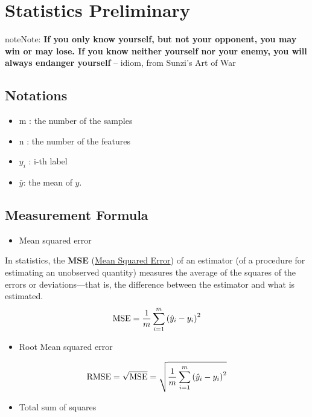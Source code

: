 \documentclass[letterpaper,11pt,english]{sphinxmanual}
\begin{document}
\chapter{Statistics Preliminary}
\label{stats:statistics-preliminary}\label{stats:yassine-alouini}\label{stats:stats}\label{stats::doc}
\begin{notice}{note}{Note:}
\textbf{If you only know yourself, but not your opponent, you may win or may lose.
If you know neither yourself nor your enemy, you will always endanger yourself}
– idiom, from Sunzi’s Art of War
\end{notice}


\section{Notations}
\label{stats:notations}\begin{itemize}
\item {} 
m : the number of the samples

\item {} 
n : the number of the features

\item {} 
\(y_i\) : i-th label

\item {} 
\({\displaystyle {\bar {y}}}\):  the mean of \(y\).

\end{itemize}


\section{Measurement Formula}
\label{stats:measurement-formula}\begin{itemize}
\item {} 
Mean squared error

\end{itemize}

In statistics, the \textbf{MSE} (\href{https://en.wikipedia.org/wiki/Mean\_squared\_error}{Mean Squared Error}) of an estimator (of a procedure for estimating an unobserved quantity) measures the average of the squares of the errors or deviations—that is, the difference between the estimator and what is estimated.
\begin{gather}
\begin{split}\text{MSE}=\frac{1}{m}\sum_{i=1}^m\left( \hat{y}_i-y_i\right)^2\end{split}\notag
\end{gather}\begin{itemize}
\item {} 
Root Mean squared error

\end{itemize}
\begin{gather}
\begin{split}\text{RMSE} = \sqrt{\text{MSE}}=\sqrt{\frac{1}{m}\sum_{i=1}^m\left( \hat{y}_i-y_i\right)^2}\end{split}\notag
\end{gather}\begin{itemize}
\item {} 
Total sum of squares

\end{itemize}
\end{document}
